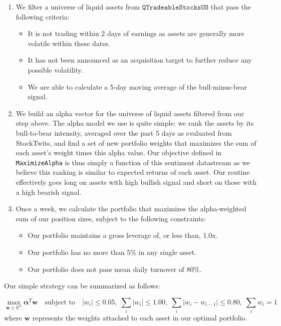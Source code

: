 \documentclass[11,]{article}
\providecommand{\tightlist}{%
  \setlength{\itemsep}{0pt}\setlength{\parskip}{0pt}}
\begin{document}
\begin{enumerate}
\def\labelenumi{\arabic{enumi}.}
\tightlist
\item
  We filter a universe of liquid assets from
  \(\texttt{QTradeableStocksUS}\) that pass the following criteria:

  \begin{itemize}
  \tightlist
  \item
    It is not trading within 2 days of earnings as assets are generally
    more volatile within these dates.
  \item
    It has not been announced as an acquisition target to further reduce
    any possible volatility.
  \item
    We are able to calculate a 5-day moving average of the
    bull-minus-bear signal.
  \end{itemize}
\item
  We build an alpha vector for the universe of liquid assets filtered
  from our step above. The alpha model we use is quite simple: we rank
  the assets by its bull-to-bear intensity, averaged over the past 5
  days as evaluated from StockTwits, and find a set of new portfolio
  weights that maximizes the sum of each asset's weight times this alpha
  value. Our objective defined in \texttt{MaximizeAlpha} is thus simply
  a function of this sentiment datastream as we believe this ranking is
  similar to expected returns of each asset. Our routine effectively
  goes long on assets with high bullish signal and short on those with a
  high bearish signal.
\item
  Once a week, we calculate the portfolio that maximizes the
  alpha-weighted sum of our position sizes, subject to the following
  constraints:

  \begin{itemize}
  \tightlist
  \item
    Our portfolio maintains a gross leverage of, or less than, 1.0x.
  \item
    Our portfolio has no more than 5\% in any single asset.
  \item
    Our portfolio does not pass mean daily turnover of 80\%.
  \end{itemize}
\end{enumerate}

Our simple strategy can be summarized as follows:

\[
\max_{{\bm{w}} \in \mathbb{R}^n} {\bm{\alpha}}^T {\bm{w}} \quad \text{subject to} \quad |w_i| \leq 0.05,\; \sum_i |w_i| \leq  1.00, \; \sum_i |w_i-w_{i-1}| \leq 0.80, \; \sum_i w_i = 1
\] \noindent where \({\bm{w}}\) represents the weights attached to each
asset in our optimal portfolio.
\end{document}
